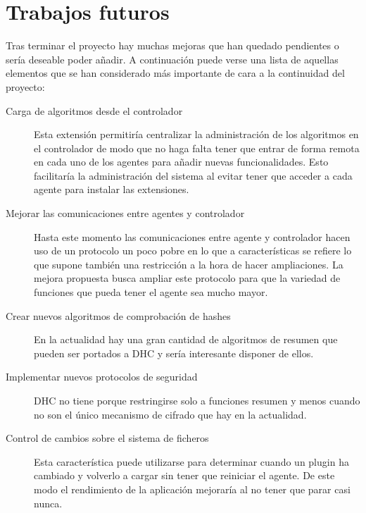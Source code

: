 \chapter{Trabajos futuros}\label{cap6}

Tras terminar el proyecto hay muchas mejoras que han quedado pendientes o sería deseable poder añadir. A continuación puede verse una lista de aquellas elementos que se han considerado más importante de cara a la continuidad del proyecto:

\begin{description}
	\item[Carga de algoritmos desde el controlador] Esta extensión permitiría centralizar la administración de los algoritmos en el controlador de modo que no haga falta tener que entrar de forma remota en cada uno de los agentes para añadir nuevas funcionalidades. Esto facilitaría la administración del sistema al evitar tener que acceder a cada agente para instalar las extensiones.

	\item[Mejorar las comunicaciones entre agentes y controlador] Hasta este momento las comunicaciones entre agente y controlador hacen uso de un protocolo un poco pobre en lo que a características se refiere lo que supone también una restricción a la hora de hacer ampliaciones. La mejora propuesta busca ampliar este protocolo para que la variedad de funciones que pueda tener el agente sea mucho mayor.

	\item[Crear nuevos algoritmos de comprobación de hashes] En la actualidad hay una gran cantidad de algoritmos de resumen que pueden ser portados a  DHC y sería interesante disponer de ellos.
	
	\item[Implementar nuevos protocolos de seguridad] DHC no tiene porque restringirse solo a funciones resumen y menos cuando no son el único mecanismo de cifrado que hay en la actualidad.

	\item[Control de cambios sobre el sistema de ficheros] Esta característica puede utilizarse para determinar cuando un plugin ha cambiado y volverlo a cargar sin tener que reiniciar el agente. De este modo el rendimiento de la aplicación mejoraría al no tener que parar casi nunca.
\end{description}